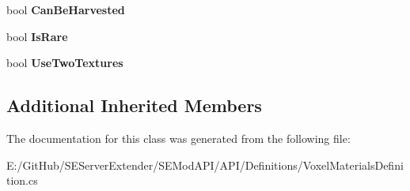 \begin{DoxyCompactItemize}
\item 
\hypertarget{class_s_e_mod_a_p_i_1_1_a_p_i_1_1_definitions_1_1_voxel_materials_definition_a74b2cf6f25a51fd124bb1a1059ec93f4}{}bool {\bfseries Can\+Be\+Harvested}\label{class_s_e_mod_a_p_i_1_1_a_p_i_1_1_definitions_1_1_voxel_materials_definition_a74b2cf6f25a51fd124bb1a1059ec93f4}

\item 
\hypertarget{class_s_e_mod_a_p_i_1_1_a_p_i_1_1_definitions_1_1_voxel_materials_definition_ad3b1013325d9adcae0eaaeff01335fb7}{}bool {\bfseries Is\+Rare}\label{class_s_e_mod_a_p_i_1_1_a_p_i_1_1_definitions_1_1_voxel_materials_definition_ad3b1013325d9adcae0eaaeff01335fb7}

\item 
\hypertarget{class_s_e_mod_a_p_i_1_1_a_p_i_1_1_definitions_1_1_voxel_materials_definition_adda5239aec923eee766a8f11bd2cbbec}{}bool {\bfseries Use\+Two\+Textures}\label{class_s_e_mod_a_p_i_1_1_a_p_i_1_1_definitions_1_1_voxel_materials_definition_adda5239aec923eee766a8f11bd2cbbec}

\end{DoxyCompactItemize}
\subsection*{Additional Inherited Members}


The documentation for this class was generated from the following file\+:\begin{DoxyCompactItemize}
\item 
E\+:/\+Git\+Hub/\+S\+E\+Server\+Extender/\+S\+E\+Mod\+A\+P\+I/\+A\+P\+I/\+Definitions/Voxel\+Materials\+Definition.\+cs\end{DoxyCompactItemize}
